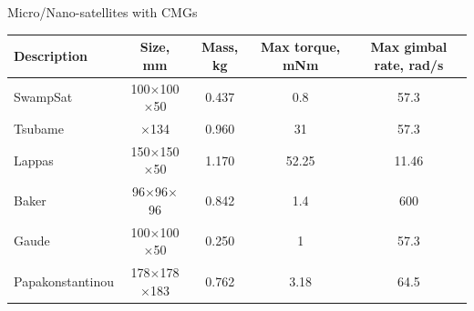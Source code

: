 \documentclass[aerospace,article,submit,moreauthors,dvi2pdf]{Definitions/mdpi}
\begin{document}
 \begin{specialtable}[H]
\caption{\label{table:cmgscompare} Micro/Nano-satellites with CMGs}
\begin{tabular}{lcccc}
\toprule
 \textbf{Description} &\textbf{ Size, mm} & \textbf{Mass, kg} & \textbf{Max torque, mNm} & \textbf{Max gimbal rate, rad/s} \\
 \midrule
SwampSat \cite{swampsat}    & 100$\times$100$\times$50 & 0.437&0.8 & 57.3\\
Tsubame  \cite{tsubame}  &\diameter50$\times$134 &0.960 &31 & 57.3\\
Lappas  \cite{lappasthesis}  & 150$\times$150$\times$50 &1.170 &52.25 & 11.46\\
Baker \cite{baker}   & 96$\times$96$\times$96& 0.842&1.4 & 600\\
Gaude  \cite{Gaude}  & 100$\times$100$\times$50  &0.250 &1 & 57.3\\ %
Papakonstantinou &178$\times$178$\times$183 & 0.762 & 3.18 & 64.5 \\
\bottomrule
\end{tabular}
\end{specialtable}
\end{document}
